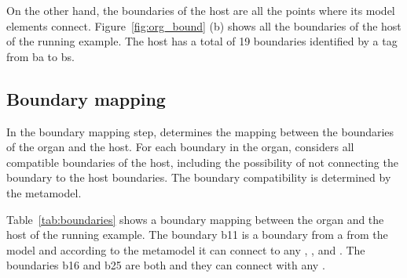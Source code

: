 On the other hand, the boundaries of the host are all the points where its model elements connect. Figure~\ref{fig:org_bound} (b) shows all the boundaries of the host of the running example. The host has a total of 19 boundaries identified by a tag from ba to bs.


\subsection{Boundary mapping}

In the boundary mapping step, \ApproachName{} determines the mapping between the boundaries of the organ and the host. For each boundary in the organ, \ApproachName{} considers all compatible boundaries of the host, including the possibility of not connecting the boundary to the host boundaries. The boundary compatibility is determined by the metamodel.

Table~\ref{tab:boundaries} shows a boundary mapping between the organ and the host of the running example. The boundary b11 is a boundary from a  from the model and according to the metamodel it can connect to any , , and . The boundaries b16 and b25 are both  and they can connect with any .

